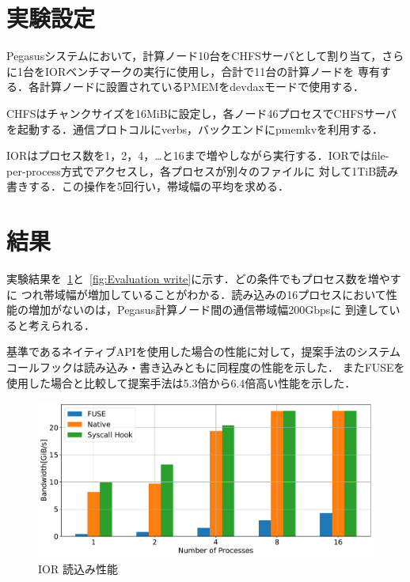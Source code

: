 \documentclass[a4paper，11pt]{jreport}
\begin{document}
\section{実験設定}
Pegasusシステムにおいて，計算ノード10台をCHFSサーバとして割り当て，さらに1台をIORベンチマークの実行に使用し，合計で11台の計算ノードを
専有する．各計算ノードに設置されているPMEMをdevdaxモードで使用する．

CHFSはチャンクサイズを16MiBに設定し，各ノード46プロセスでCHFSサーバを起動する．通信プロトコルにverbs，バックエンドにpmemkvを利用する．

IORはプロセス数を1，2，4，…と16まで増やしながら実行する．IORではfile-per-process方式でアクセスし，各プロセスが別々のファイルに
対して1TiB読み書きする．この操作を5回行い，帯域幅の平均を求める．
\section{結果}

実験結果を\figurename~\ref{fig:Evaluation read}と\figurename~\ref{fig:Evaluation write}に示す．どの条件でもプロセス数を増やすに
つれ帯域幅が増加していることがわかる．読み込みの16プロセスにおいて性能の増加がないのは，Pegasus計算ノード間の通信帯域幅200Gbpsに
到達していると考えられる．

基準であるネイティブAPIを使用した場合の性能に対して，提案手法のシステムコールフックは読み込み・書き込みともに同程度の性能を示した．
またFUSEを使用した場合と比較して提案手法は5.3倍から6.4倍高い性能を示した．

\newpage

\begin{figure}[h]
	\begin{minipage}[b]{1\columnwidth}
		\centering
		\includegraphics[width=0.9\linewidth]{./figure/ior_benchmark_read_v2.pdf}
		\caption{IOR 読込み性能}
		\label{fig:Evaluation read}
	\end{minipage}
\end{figure}
\end{document}
